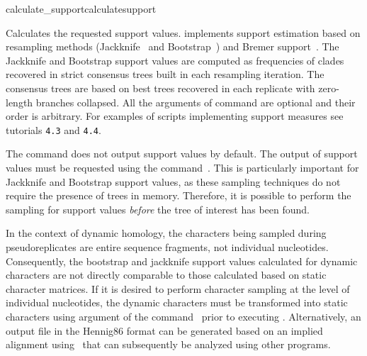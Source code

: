 \begin{command}{calculate\_support}{calculatesupport}


	\begin{poydescription} 
            Calculates the requested support values. \poy implements support
            estimation based on resampling methods (Jackknife~\cite{Farrisetal1996} 
            and Bootstrap~\cite{Felsenstein1985}) and Bremer support~\cite{Bremer1988, Kallersjoetal1992}. 
            The Jackknife and Bootstrap support values are computed as
            frequencies of clades recovered in strict consensus trees built in each resampling
            iteration. The consensus trees are based on best trees recovered in each replicate
            with zero-length branches collapsed.
            All the arguments of  command are optional and
            their order is arbitrary.  For examples of scripts implementing support measures see 
            tutorials \texttt{4.3} and \texttt{4.4}. 
            
The  command does not output support values by default. The output of
            support values must be requested using the command~. 
            This is particularly important for
            Jackknife and Bootstrap support values, as these sampling techniques
            do not require the presence of trees in memory. Therefore, it is
            possible to perform the sampling for support values \emph{before}
            the tree of interest has been found.
            
            \begin{statement}
                In the context of dynamic
                homology, the characters being sampled during pseudoreplicates
                are entire sequence fragments, not individual nucleotides.
                Consequently, the bootstrap and jackknife support values
                calculated for dynamic characters are not directly comparable to
                those calculated based on static character matrices. If it is
                desired to perform character sampling at the level of
                individual nucleotides, the dynamic characters must be
                transformed into static characters using 
                argument of the command~
                prior to executing .
                Alternatively, an output file in the Hennig86 format can be
                generated based on an implied alignment
                using~ that can subsequently be analyzed
                using other programs.
                                

\end{statement}
\end{poydescription}
\end{command}
